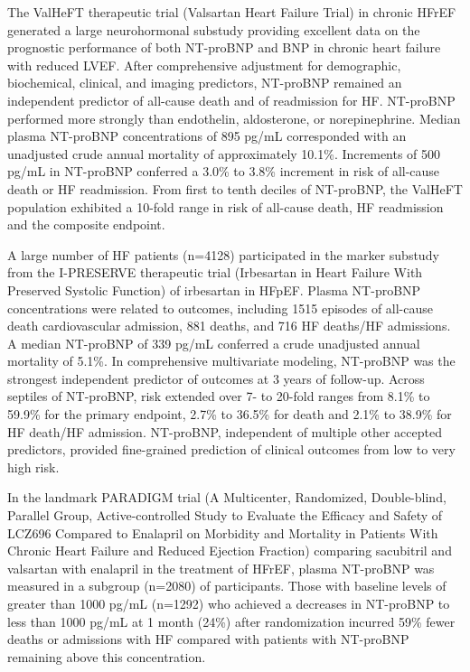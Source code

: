 \documentclass[14pt,a4paper,onecolumn]{extarticle}
\begin{document}
The ValHeFT therapeutic trial (Valsartan Heart Failure Trial) in chronic HFrEF generated a large neurohormonal substudy providing excellent data on the prognostic performance of both NT-proBNP and BNP in chronic heart failure with reduced LVEF.  After comprehensive adjustment for demographic, biochemical, clinical, and imaging predictors, NT-proBNP remained an independent predictor of all-cause death and of readmission for HF. NT-proBNP performed more strongly than endothelin, aldosterone, or norepinephrine. Median plasma NT-proBNP concentrations of 895 pg/mL corresponded with an unadjusted crude annual mortality of approximately 10.1\%. Increments of 500 pg/mL in NT-proBNP conferred a 3.0\% to 3.8\% increment in risk of all-cause death or HF readmission. From first to tenth deciles of NT-proBNP, the ValHeFT population exhibited a 10-fold range in risk of all-cause death, HF readmission and the composite endpoint. \citep{bib3204}

A large number of HF patients (n=4128) participated in the marker substudy from the I-PRESERVE therapeutic trial (Irbesartan in Heart Failure With Preserved Systolic Function) of irbesartan in HFpEF. Plasma NT-proBNP concentrations were related to outcomes, including 1515 episodes of all-cause death cardiovascular admission, 881 deaths, and 716 HF deaths/HF admissions. A median NT-proBNP of 339 pg/mL conferred a crude unadjusted annual mortality of 5.1\%. In comprehensive multivariate modeling, NT-proBNP was the strongest independent predictor of outcomes at 3 years of follow-up. Across septiles of NT-proBNP, risk extended over 7- to 20-fold ranges from 8.1\% to 59.9\% for the primary endpoint, 2.7\% to 36.5\% for death and 2.1\% to 38.9\% for HF death/HF admission. NT-proBNP, independent of multiple other accepted predictors, provided fine-grained prediction of clinical outcomes from low to very high risk. \citep{Komajda2011}

In the landmark PARADIGM trial (A Multicenter, Randomized, Double-blind, Parallel Group, Active-controlled Study to Evaluate the Efficacy and Safety of LCZ696 Compared to Enalapril on Morbidity and Mortality in Patients With Chronic Heart Failure and Reduced Ejection Fraction) comparing sacubitril and valsartan with enalapril in the treatment of HFrEF, plasma NT-proBNP was measured in a subgroup (n=2080) of participants.  Those with baseline levels of greater than 1000 pg/mL (n=1292) who achieved a decreases in NT-proBNP to less than 1000 pg/mL at 1 month (24\%) after randomization incurred 59\% fewer deaths or admissions with HF compared with patients with NT-proBNP remaining above this concentration. \citep{Zile2016}
\end{document}
